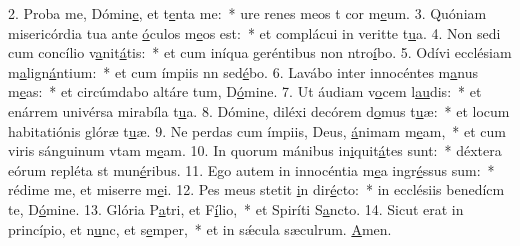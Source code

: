 2. Proba me, Dómin\uline{e}, et t\uline{e}nta me:~* ure renes meos t cor m\uline{e}um.
3. Quóniam misericórdia tua ante \uline{ó}culos m\uline{e}os est:~* et complácui in veritte t\uline{u}a.
4. Non sedi cum concílio v\uline{a}nit\uline{á}tis:~* et cum iníqua geréntibus non ntro\uline{í}bo.
5. Odívi ecclésiam m\uline{a}lign\uline{á}ntium:~* et cum ímpiis nn sed\uline{é}bo.
6. Lavábo inter innocéntes m\uline{a}nus m\uline{e}as:~* et circúmdabo altáre tum, D\uline{ó}mine.
7. Ut áudiam v\uline{o}cem l\uline{au}dis:~* et enárrem univérsa mirabíla t\uline{u}a.
8. Dómine, diléxi decórem d\uline{o}mus t\uline{u}æ:~* et locum habitatiónis glóræ t\uline{u}æ.
9. Ne perdas cum ímpiis, Deus, \uline{á}nimam m\uline{e}am,~* et cum viris sánguinum vtam m\uline{e}am.
10. In quorum mánibus in\uline{i}quit\uline{á}tes sunt:~* déxtera eórum repléta st mun\uline{é}ribus.
11. Ego autem in innocéntia m\uline{e}a ingr\uline{é}ssus sum:~* rédime me, et miserre m\uline{e}i.
12. Pes meus stetit \uline{i}n dir\uline{é}cto:~* in ecclésiis benedícm te, D\uline{ó}mine.
13. Glória P\uline{a}tri, et F\uline{í}lio,~* et Spiríti S\uline{a}ncto.
14. Sicut erat in princípio, et n\uline{u}nc, et s\uline{e}mper,~* et in sǽcula sæculrum. \uline{A}men.
